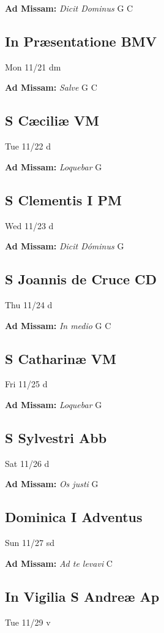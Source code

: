 \documentclass[letterpaper, 10pt, twocolumn]{article}
\begin{document}
\textbf{Ad Missam:} \textit{Dicit Dominus} G C 

\subsection*{In Præsentatione BMV}Mon 11/21 dm

\textbf{Ad Missam:} \textit{Salve} G C 

\subsection*{S Cæciliæ VM}Tue 11/22 d

\textbf{Ad Missam:} \textit{Loquebar} G 

\subsection*{S Clementis I PM}Wed 11/23 d

\textbf{Ad Missam:} \textit{Dicit Dóminus} G 

\subsection*{S Joannis de Cruce CD}Thu 11/24 d

\textbf{Ad Missam:} \textit{In medio} G C 

\subsection*{S Catharinæ VM}Fri 11/25 d

\textbf{Ad Missam:} \textit{Loquebar} G 

\subsection*{S Sylvestri Abb}Sat 11/26 d

\textbf{Ad Missam:} \textit{Os justi} G 

\subsection*{Dominica I Adventus}Sun 11/27 sd

\textbf{Ad Missam:} \textit{Ad te levavi} C 

\subsection*{In Vigilia S Andreæ Ap}Tue 11/29 v
\end{document}
